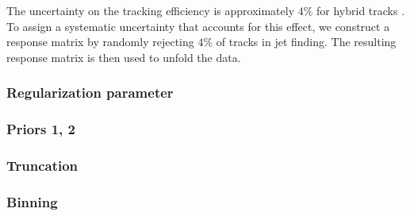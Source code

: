 \documentclass[12pt]{article}
\begin{document}
The uncertainty on the tracking efficiency is approximately $4\%$ for hybrid tracks \cite{Alice_AN_534,Alice_AN_818,james,ezra}.
To assign a systematic uncertainty that accounts for this effect, we construct a response matrix by randomly rejecting $4\%$ of tracks in jet finding.
The resulting response matrix is then used to unfold the data.

\subsubsection{Regularization parameter}
\subsubsection{Priors 1, 2}
\subsubsection{Truncation}
\subsubsection{Binning}




\end{document}
